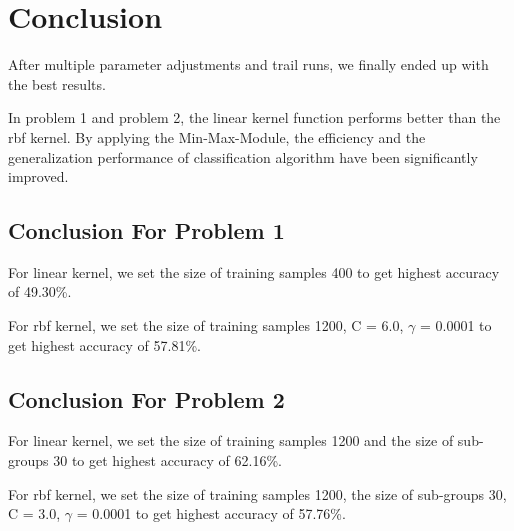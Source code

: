 \clearpage
\section{Conclusion}
After multiple parameter adjustments and trail runs, we finally ended up with the best results.


In problem 1 and problem 2, the linear kernel function performs better than the rbf kernel. By applying the Min-Max-Module, the efficiency and the generalization performance of classification algorithm have been significantly improved.

\subsection{Conclusion For Problem 1}
For linear kernel, we set the size of training samples 400 to get highest accuracy of 49.30\%.  


For rbf kernel, we set the size of training samples 1200, C = 6.0, $\gamma$ = 0.0001 to get highest accuracy of 57.81\%.  

\subsection{Conclusion For Problem 2}
For linear kernel, we set the size of training samples 1200 and the size of sub-groups 30 to get highest accuracy of 62.16\%. 


For rbf kernel, we set the size of training samples 1200, the size of sub-groups 30, C = 3.0, $\gamma$ = 0.0001 to get highest accuracy of 57.76\%.  

